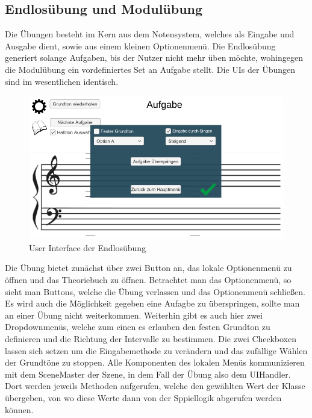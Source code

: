 \subsection*{Endlosübung und Modulübung}
Die Übungen besteht im Kern aus dem Notensystem, welches als Eingabe und Ausgabe dient, sowie aus einem kleinen Optionenmenü. Die Endlosübung generiert solange Aufgaben, bis der Nutzer nicht mehr üben möchte, wohingegen die Modulübung ein vordefiniertes Set an Aufgabe stellt. Die UIs der Übungen sind im wesentlichen identisch. 
\begin{figure}[H]
    \centering
    \includegraphics[width=1\textwidth]{Bilder/endlosspiel.png}
    \caption{User Interface der Endlosübung}
    \label{sec:hps_algo}
\end{figure}
Die Übung bietet zunächst über zwei Button an, das lokale Optionenmenü zu öffnen und das Theoriebuch zu öffnen. Betrachtet man das Optionenmenü, so sieht man Buttons, welche die Übung verlassen und das Optionenmenü schließen. Es wird auch die Möglichkeit gegeben eine Aufagbe zu überspringen, sollte man an einer Übung nicht weiterkommen. Weiterhin gibt es auch hier zwei Dropdownmenüs, welche zum einen es erlauben den festen Grundton zu definieren und die Richtung der Intervalle zu bestimmen. Die zwei Checkboxen lassen sich setzen um die Eingabemethode zu verändern und das zufällige Wählen der Grundtöne zu stoppen. Alle Komponenten des lokalen Menüs kommunizieren mit dem SceneMaster der Szene, in dem Fall der Übung also dem UIHandler. Dort werden jeweils Methoden aufgerufen, welche den gewählten Wert der Klasse übergeben, von wo diese Werte dann von der Sppiellogik abgerufen werden können. \\
